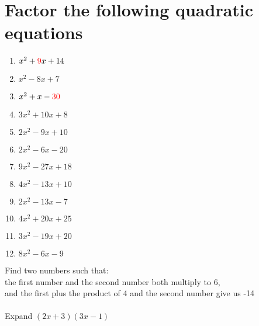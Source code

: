 \documentclass[12pt]{article}
\begin{document}
\section*{Factor the following quadratic equations}
\begin{minipage}[t]{0.45\textwidth}
    \begin{enumerate}[\#1)]
        \setcounter{enumi}{0} %
        \item  $x^2+{\color{red} 9}x+14$
        \vspace{1em}
        \item  $x^2-8x+7$
        \vspace{1em}
        \item  $x^2+x-{\color{red} 30}$
        \vspace{1em}
        \item  $3x^2+10x+8$
        \vspace{1em}
        \item  $2x^2-9x+10$
        \vspace{1em}
        \item  $2x^2-6x-20$
        \end{enumerate}
\end{minipage}%
\hspace{1cm}
\begin{minipage}[t]{0.45\textwidth}
    \begin{enumerate}[\#1)]
        \setcounter{enumi}{6} %
        \item  $9x^2-27x+18$
        \vspace{1em}
        \item  $4x^2-13x+10$
        \vspace{1em}
        \item  $2x^2-13x-7$
        \vspace{1em}
        \item  $4x^2+20x+25$
        \vspace{1em}
        \item  $3x^2-19x+20$
        \vspace{1em}
        \item  $8x^2-6x-9$

    \end{enumerate}
\end{minipage}

\begin{comment}
Notes:
- make ++ to ++, -- to +- table etc
- double check forms
- connect to zeros
- similar thing but a is not 1 as before
- show how graph is affected
- (x-m)(x-n) to (x+m)(x+n)
- backwards and expand to quadratic
- factor vs quadratic formula worksheet
\end{comment}


Find two numbers such that: \\
the first number and the second number both multiply to 6,\\
and the first plus the product of 4 and the second number give us -14
\\\\
\noindent
Expand $(2x+3)(3x-1)$
\end{document}
